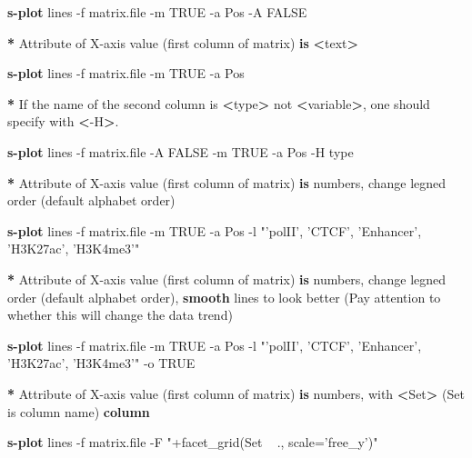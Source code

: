 \documentclass[]{article}
\newenvironment{Shaded}{\begin{snugshade}}{\end{snugshade}}
\newcommand{\KeywordTok}[1]{\textcolor[rgb]{0.13,0.29,0.53}{\textbf{{#1}}}}
\newcommand{\StringTok}[1]{\textcolor[rgb]{0.31,0.60,0.02}{{#1}}}
\newcommand{\NormalTok}[1]{{#1}}
\numberwithin{figure}{section}
\numberwithin{table}{section}
\theoremstyle{definition}
\theoremstyle{definition}
\theoremstyle{definition}
\theoremstyle{remark}
\begin{document}
\begin{Shaded}
\begin{Highlighting}[]
    \KeywordTok{s-plot} \NormalTok{lines -f matrix.file -m TRUE -a Pos -A FALSE}

\KeywordTok{*} \NormalTok{Attribute of X-axis value (first column of matrix) }\KeywordTok{is} \KeywordTok{<}\NormalTok{text}\KeywordTok{>}

    \KeywordTok{s-plot} \NormalTok{lines -f matrix.file -m TRUE -a Pos}

\KeywordTok{*} \NormalTok{If the name of the second column is }\KeywordTok{<}\NormalTok{type}\KeywordTok{>} \NormalTok{not }\KeywordTok{<}\NormalTok{variable}\KeywordTok{>}\NormalTok{, one should specify with }\KeywordTok{<}\NormalTok{-H}\KeywordTok{>}\NormalTok{. }
    
    \KeywordTok{s-plot} \NormalTok{lines -f matrix.file -A FALSE -m TRUE -a Pos -H type}

\KeywordTok{*} \NormalTok{Attribute of X-axis value (first column of matrix) }\KeywordTok{is} \NormalTok{numbers, change legned order (default alphabet order)}

    \KeywordTok{s-plot} \NormalTok{lines -f matrix.file -m TRUE -a Pos -l }\StringTok{"'polII', 'CTCF', 'Enhancer', 'H3K27ac', 'H3K4me3'"}

\KeywordTok{*} \NormalTok{Attribute of X-axis value (first column of matrix) }\KeywordTok{is} \NormalTok{numbers, change legned order (default alphabet order), }\KeywordTok{smooth} \NormalTok{lines to look better (Pay attention to whether this will change the data trend)}

    \KeywordTok{s-plot} \NormalTok{lines -f matrix.file -m TRUE -a Pos -l }\StringTok{"'polII', 'CTCF', 'Enhancer', 'H3K27ac', 'H3K4me3'"} \NormalTok{-o TRUE}

\KeywordTok{*} \NormalTok{Attribute of X-axis value (first column of matrix) }\KeywordTok{is} \NormalTok{numbers, with }\KeywordTok{<}\NormalTok{Set}\KeywordTok{>} \NormalTok{(Set is column name) }\KeywordTok{column}
    
    \KeywordTok{s-plot} \NormalTok{lines -f matrix.file -F }\StringTok{"+facet_grid(Set ~ ., scale='free_y')"}



\end{Highlighting}
\end{Shaded}
\end{document}
